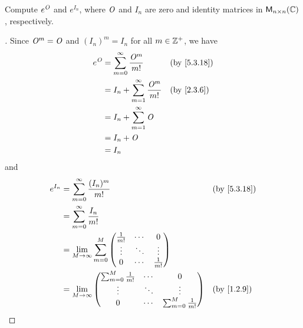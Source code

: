 \begin{ex}\label{ex:5.3.20}
	Compute \(e^{\mathit{O}}\) and \(e^{I_n}\), where \(\mathit{O}\) and \(I_n\) are zero and identity matrices in \(\mathsf{M}_{{n} \times n}({\mathbb{C}})\), respectively.
\end{ex}

\begin{proof}[]
	Since \(\mathit{O}^m = \mathit{O}\) and \((I_n)^m = I_n\) for all \(m \in \mathbb{Z}^+\), we have
	\begin{align*}
		e^{\zm} & = \sum_{m = 0}^\infty \frac{\zm^m}{m!}       &  & \by{5.3.18} \\
		        & = I_n + \sum_{m = 1}^\infty \frac{\zm^m}{m!} &  & \by{2.3.6}  \\
		        & = I_n + \sum_{m = 1}^\infty \zm                               \\
		        & = I_n + \zm                                                   \\
		        & = I_n
	\end{align*}
	and
	\begin{align*}
		e^{I_n} & = \sum_{m = 0}^\infty \frac{(I_n)^m}{m!}                                                                      &  & \by{5.3.18} \\
		        & = \sum_{m = 0}^\infty \frac{I_n}{m!}                                                                                           \\
		        & = \lim_{M \to \infty} \sum_{m = 0}^M \begin{pmatrix}
			                                               \frac{1}{m!} & \cdots & 0            \\
			                                               \vdots       & \ddots & \vdots       \\
			                                               0            & \cdots & \frac{1}{m!}
		                                               \end{pmatrix}                                                      \\
		        & = \lim_{M \to \infty} \begin{pmatrix}
			                                \sum_{m = 0}^M  \frac{1}{m!} & \cdots & 0                           \\
			                                \vdots                       & \ddots & \vdots                      \\
			                                0                            & \cdots & \sum_{m = 0}^M \frac{1}{m!}
		                                \end{pmatrix}                                        &  & \by{1.2.9}                                     \\

\end{align*}
\end{proof}

